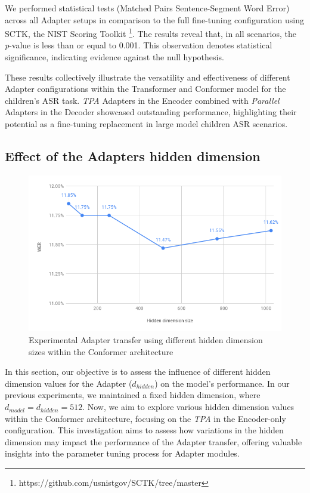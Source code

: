 We performed statistical tests (Matched Pairs Sentence-Segment Word Error) across all Adapter setups in comparison to the full fine-tuning configuration using SCTK, the NIST Scoring Toolkit \footnote{https://github.com/usnistgov/SCTK/tree/master}. 
The results reveal that, in all scenarios, the \textit{p}-value is less than or equal to 0.001. This observation denotes statistical significance, indicating evidence against the null hypothesis. 

These results collectively illustrate the versatility and effectiveness of different Adapter configurations within the Transformer and  Conformer model for the children's \ac{ASR} task. \textit{\ac{TPA}} Adapters in the Encoder combined with \textit{Parallel} Adapters in the Decoder showcased outstanding performance, highlighting their potential as a fine-tuning replacement in large model children \ac{ASR} scenarios.

\subsection{Effect of the Adapters hidden dimension}
\begin{figure}
    \begin{center}
    \includegraphics[scale=0.5]{imgs/HiddenDimEXP.png}
    \caption{Experimental Adapter transfer using different hidden dimension sizes within the Conformer architecture }
    \label{fig:HiddenDim}    
\end{center}
    
\end{figure}

In this section, our objective is to assess the influence of different hidden dimension values for the Adapter ($d_{hidden}$) on the model's performance. In our previous experiments, we maintained a fixed hidden dimension, where $d_{model} = d_{hidden} = 512$. Now, we aim to explore various hidden dimension values within the Conformer architecture, focusing on the \textit{\ac{TPA}} in the Encoder-only configuration. This investigation aims to assess how variations in the hidden dimension may impact the performance of the Adapter transfer, offering valuable insights into the parameter tuning process for Adapter modules.

